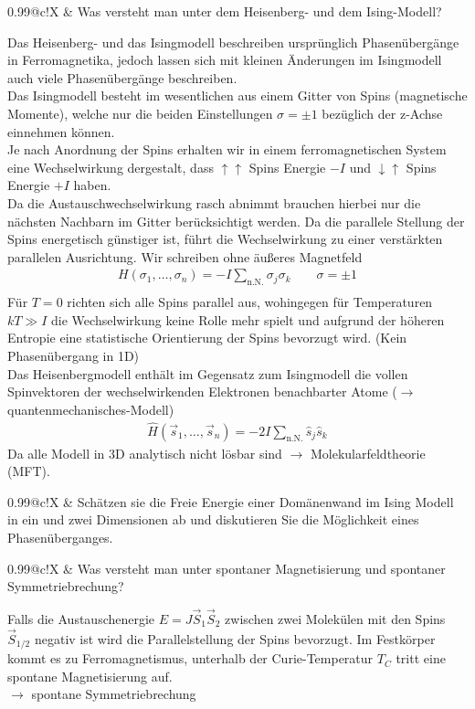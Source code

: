 \documentclass[a4paper,12pt]{scrartcl}
\makeatletter
\newcounter{qc}\setcounter{qc}{1}
\newenvironment{fshaded}{
\def\FrameCommand{\fcolorbox{framecolor}{shadecolor}}
\MakeFramed {\FrameRestore}}
{\endMakeFramed}
\def\frage#1{
\begin{fshaded}
\noindent
\begin{tabularx}{0.99\textwidth}{@{}c!{\color{framecolor}\vline}X}
{ \bf \rm \theqc }	&	\noindent #1
\end{tabularx}
\stepcounter{qc}
\end{fshaded}
}
\makeatother
\begin{document}
\frage{Was versteht man unter dem Heisenberg- und dem Ising-Modell?}
\noindent
Das Heisenberg- und das Isingmodell beschreiben ursprünglich Phasenübergänge in Ferromagnetika,
jedoch lassen sich mit kleinen Änderungen im Isingmodell auch viele Phasenübergänge
beschreiben.\\
Das Isingmodell besteht im wesentlichen aus einem Gitter von Spins (magnetische Momente), welche
nur die beiden Einstellungen $\sigma =\pm 1$ bezüglich der z-Achse einnehmen können.\\
Je nach Anordnung der Spins erhalten wir in einem ferromagnetischen System eine Wechselwirkung
dergestalt, dass $\uparrow\uparrow$ Spins Energie $-I$ und $\downarrow\uparrow$ Spins Energie $+I$
haben.\\
Da die Austauschwechselwirkung rasch abnimmt brauchen hierbei nur die nächsten Nachbarn im Gitter
berücksichtigt werden. Da die parallele Stellung der Spins energetisch günstiger ist, führt die
Wechselwirkung zu einer verstärkten parallelen Ausrichtung. Wir schreiben ohne äußeres Magnetfeld
\begin{align*}
H\left({\sigma_1,\ldots,\sigma_n }\right)=-I\sum_{\text{n.N.}}\sigma_j\sigma_k\qquad\sigma=
\pm{1}\\
\end{align*}
Für $T=0$ richten sich alle Spins parallel aus, wohingegen für Temperaturen ${kT}\gg{I}$  die
Wechselwirkung keine Rolle mehr spielt und aufgrund der höheren Entropie eine statistische
Orientierung der Spins bevorzugt wird. (Kein Phasenübergang in 1D)\\
Das Heisenbergmodell enthält im Gegensatz zum Isingmodell die vollen Spinvektoren der
wechselwirkenden Elektronen benachbarter Atome ($\rightarrow$ quantenmechanisches-Modell)
\begin{align*}
\hat{H}\left({\vec{s}_1,\ldots,\vec{s}_n }\right)=-2I\sum_{\text{n.N.}}\hat{s}_j\hat{s}_k
\end{align*}
Da alle Modell in 3D analytisch nicht lösbar sind $\rightarrow$ Molekularfeldtheorie (MFT).

\frage{Schätzen sie die Freie Energie einer Domänenwand im Ising Modell in ein und zwei Dimensionen ab und diskutieren Sie die 
Möglichkeit eines Phasenüberganges.}
\noindent

\frage{Was versteht man unter spontaner Magnetisierung und spontaner Symmetriebrechung?}
\noindent
Falls die Austauschenergie $E=J\vec S_1\vec S_2$ zwischen zwei Molekülen mit den Spins $\vec S_{1/2}$ negativ ist wird die 
Parallelstellung der Spins bevorzugt. Im Festkörper kommt es zu Ferromagnetismus, unterhalb der
Curie-Temperatur $T_C$ tritt eine spontane Magnetisierung auf.\\
$\rightarrow$ spontane Symmetriebrechung
\end{document}
